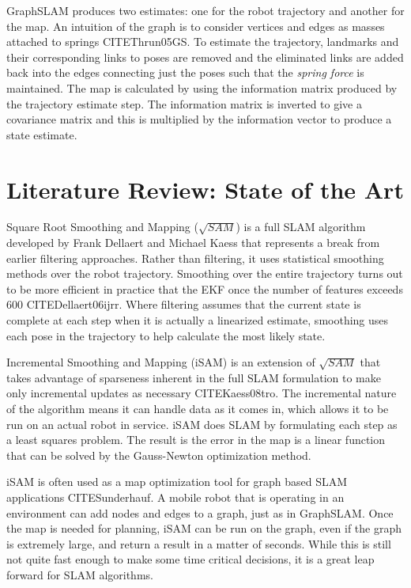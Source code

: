 \documentclass[12pt]{report}
\begin{document}
GraphSLAM produces two estimates: one for the robot trajectory and another for the map.  An intuition of the graph is to consider vertices and edges as masses attached to springs CITE{Thrun05GS}.  To estimate the trajectory, landmarks and their corresponding links to poses are removed and the eliminated links are added back into the edges connecting just the poses such that the \emph{spring force} is maintained.  The map is calculated by using the information matrix produced by the trajectory estimate step.  The information matrix is inverted to give a covariance matrix and this is multiplied by the information vector to produce a state estimate.  



\section{Literature Review: State of the Art}

Square Root Smoothing and Mapping ($\sqrt{SAM}$) is a full SLAM algorithm developed by Frank Dellaert and Michael Kaess that represents a break from earlier filtering approaches. Rather than filtering, it uses statistical smoothing methods over the robot trajectory.  Smoothing over the entire trajectory turns out to be more efficient in practice that the EKF once the number of features exceeds 600 CITE{Dellaert06ijrr}.  Where filtering assumes that the current state is complete at each step when it is actually a linearized estimate, smoothing uses each pose in the trajectory to help calculate the most likely state.

Incremental Smoothing and Mapping (iSAM) is an extension of $\sqrt{SAM}$ that takes advantage of sparseness inherent in the full SLAM formulation to make only incremental updates as necessary CITE{Kaess08tro}. The incremental nature of the algorithm means it can handle data as it comes in, which allows it to be run on an actual robot in service.  iSAM does SLAM by formulating each step as a least squares problem.  The result is the error in the map is a linear function that can be solved by the Gauss-Newton optimization method.

iSAM is often used as a map optimization tool for graph based SLAM applications CITE{Sunderhauf}.  A mobile robot that is operating in an environment can add nodes and edges to a graph, just as in GraphSLAM.  Once the map is needed for planning, iSAM can be run on the graph, even if the graph is extremely large, and return a result in a matter of seconds.  While this is still not quite fast enough to make some time critical decisions, it is a great leap forward for SLAM algorithms.
\end{document}
